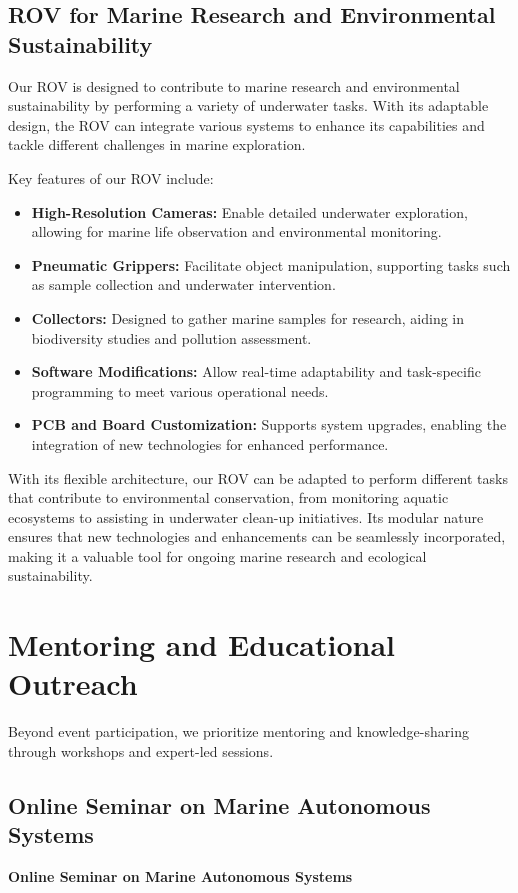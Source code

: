 \documentclass[11pt, twocolumn]{article}
\begin{document}
\subsection{ROV for Marine Research and Environmental Sustainability}

Our ROV is designed to contribute to marine research and environmental sustainability by performing a variety of underwater tasks. With its adaptable design, the ROV can integrate various systems to enhance its capabilities and tackle different challenges in marine exploration. 

Key features of our ROV include:
\begin{itemize}
    \item \textbf{High-Resolution Cameras:} Enable detailed underwater exploration, allowing for marine life observation and environmental monitoring.
    \item \textbf{Pneumatic Grippers:} Facilitate object manipulation, supporting tasks such as sample collection and underwater intervention.
    \item \textbf{Collectors:} Designed to gather marine samples for research, aiding in biodiversity studies and pollution assessment.
    \item \textbf{Software Modifications:} Allow real-time adaptability and task-specific programming to meet various operational needs.
    \item \textbf{PCB and Board Customization:} Supports system upgrades, enabling the integration of new technologies for enhanced performance.
\end{itemize}

With its flexible architecture, our ROV can be adapted to perform different tasks that contribute to environmental conservation, from monitoring aquatic ecosystems to assisting in underwater clean-up initiatives. Its modular nature ensures that new technologies and enhancements can be seamlessly incorporated, making it a valuable tool for ongoing marine research and ecological sustainability.



\newpage
\section{Mentoring and Educational Outreach}
Beyond event participation, we prioritize mentoring and knowledge-sharing through workshops and expert-led sessions.

\subsection{Online Seminar on Marine Autonomous Systems}
\textbf{Online Seminar on Marine Autonomous Systems}
\end{document}
